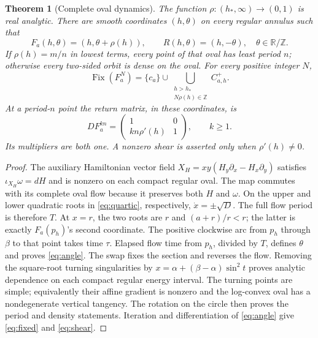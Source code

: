 \documentclass[10pt]{article}
\newcommand{\R}{\mathbb R}
\newcommand{\Z}{\mathbb Z}
\newcommand{\Fix}{\operatorname{Fix}}
\newtheorem{theorem}{Theorem}
\begin{document}
\begin{theorem}[Complete oval dynamics]\label{thm:rotation}
The function $\rho:(h_*,\infty)\to(0,1)$ is real analytic.
There are smooth coordinates $(h,\theta)$ on every regular annulus such that
\begin{equation}\label{eq:angle}
 F_a(h,\theta)=(h,\theta+\rho(h)),\qquad
 R(h,\theta)=(h,-\theta),\quad \theta\in\R/\Z.
\end{equation}
If $\rho(h)=m/n$ in lowest terms, every point of that oval has least
period $n$; otherwise every two-sided orbit is dense on the oval. For
every positive integer $N$,
\begin{equation}\label{eq:fixed}
 \Fix(F_a^N)=\{c_a\}\cup
 \bigcup_{\substack{h>h_*\\N\rho(h)\in\Z}}C^+_{a,h}.
\end{equation}
At a period-$n$ point the return matrix, in these coordinates, is
\begin{equation}\label{eq:shear}
 D F_a^{kn}=\begin{pmatrix}1&0\\kn\rho'(h)&1\end{pmatrix},\qquad k\ge1.
\end{equation}
Its multipliers are both one. A nonzero shear is asserted only when
$\rho'(h)\ne0$.
\end{theorem}
\begin{proof}
The auxiliary Hamiltonian vector field
$X_H=xy(H_y\partial_x-H_x\partial_y)$ satisfies
$\iota_{X_H}\omega=dH$ and is nonzero on each compact regular oval.
The map commutes with its complete oval flow because it preserves both
$H$ and $\omega$. On the upper and lower quadratic roots in
\eqref{eq:quartic}, respectively, $\dot x=\pm\sqrt D$. The full flow
period is therefore $T$. At $x=r$, the two roots are $r$ and
$(a+r)/r<r$; the latter is exactly $F_a(p_h)$'s second coordinate.
The positive clockwise arc from $p_h$ through $\beta$ to that point
takes time $\tau$. Elapsed flow time from $p_h$, divided by $T$,
defines $\theta$ and proves \eqref{eq:angle}. The swap fixes the section
and reverses the flow. Removing the square-root turning singularities
by $x=\alpha+(\beta-\alpha)\sin^2t$ proves analytic dependence on
each compact regular energy interval. The turning points are simple;
equivalently their affine gradient is nonzero and the log-convex oval
has a nondegenerate vertical tangency. The rotation on the circle then
proves the period and density statements. Iteration and differentiation
of \eqref{eq:angle} give \eqref{eq:fixed} and \eqref{eq:shear}.
\end{proof}
\end{document}
